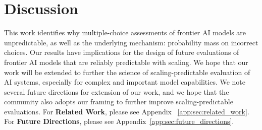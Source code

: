 \section{Discussion}
\label{sec:discussion}


This work identifies why multiple-choice assessments of frontier AI models are unpredictable, as well as the underlying mechanism: probability mass on incorrect choices.
%
Our results have implications for the design of future evaluations of frontier AI models that are reliably predictable with scaling. We hope that our work will be extended to further the science of scaling-predictable evaluation of AI systems, especially for complex and important model capabilities.
We note several future directions for extension of our work, and we hope that the community also adopts our framing to further improve scaling-predictable evaluations. 
%
For \textbf{Related Work}, please see Appendix ~\ref{app:sec:related_work}.
For \textbf{Future Directions}, please see Appendix~\ref{app:sec:future_directions}.



